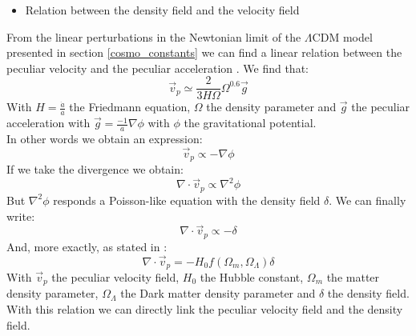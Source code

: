 \documentclass[12pt]{article}
\begin{document}
\begin{itemize}
\item Relation between the density field and the velocity field
\end{itemize}

\begin{par}
From the linear perturbations in the Newtonian limit of
 the $\Lambda$CDM model presented in section
  \ref{cosmo_constants} we can find a linear relation
   between the peculiar velocity and the peculiar
    acceleration \cite{padmanabhan_theoretical_2000}.
     We find that:
\[
\vec{v}_p \simeq \frac{2}{3 H \Omega} \Omega^{0.6} \vec{g}
\]
With $H = \frac{\dot{a}}{a}$ the Friedmann equation,
 $\Omega$ the density parameter and $\vec{g}$ the
  peculiar acceleration with $\vec{g} = \frac{-1}{a}
   \nabla \phi $ with $\phi$ the gravitational
    potential.\\
In other words we obtain an expression:
\[ 
\vec{v}_p \propto  - \nabla \phi
\]
If we take the divergence we obtain:
\[
\nabla \cdot \vec{v}_p \propto \nabla^2 \phi
\]
But $\nabla^2 \phi$ responds a Poisson-like equation
 with the density field $\delta$. We can finally write:
\[
\nabla \cdot \vec{v}_p \propto - \delta
\]
And, more exactly, as stated in
 \cite{tully_laniakea_2014}: 
\[
\nabla \cdot \vec{v}_p = - H_0 f(\Omega_m, \Omega_{\Lambda}) \delta
\] 
With $\vec{v}_p$ the peculiar velocity field, $H_0$ the
 Hubble constant, $\Omega_m$ the matter density
  parameter, $\Omega_{\Lambda}$ the Dark matter density
   parameter and $\delta$ the density field.\\
   With this relation we can directly link the peculiar
    velocity field and the density field.
\end{par}
\end{document}
